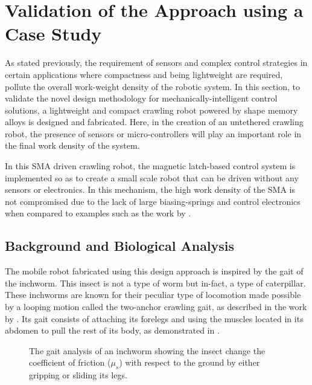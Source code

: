 \section{Validation of the Approach using a Case Study}
As stated previously, the requirement of sensors and complex control strategies in certain applications where compactness and being lightweight are required, pollute the overall work-weight density of the robotic system. In this section, to validate the novel design methodology for mechanically-intelligent control solutions, a lightweight and compact crawling robot powered by shape memory alloys is designed and fabricated. Here, in the creation of an untethered crawling robot, the presence of sensors or micro-controllers will play an important role in the final work density of the system.

In this SMA driven crawling robot, the magnetic latch-based control system is implemented so as to create a small scale robot that can be driven without any sensors or electronics. In this mechanism, the high work density of the SMA is not compromised due to the lack of large biasing-springs and control electronics when compared to examples such as the work by \todocite.

\subsection{Background and Biological Analysis}\label{subsec:bio-analysis}
The mobile robot fabricated using this design approach is inspired by the gait of the inchworm. This insect is not a type of worm but in-fact, a type of caterpillar. These inchworms are known for their peculiar type of locomotion made possible by a looping motion called the two-anchor crawling gait, as described in the work by \todocite. Its gait consists of attaching its forelegs and using the muscles located in its abdomen to pull the rest of its body, as demonstrated in \todocite.

\begin{figure}[ht!] %
  \centering
  \def\svgwidth{\textwidth}
  \resizebox{\textwidth}{!}{}
  \caption{The gait analysis of an inchworm showing the insect change the coefficient of friction ($\mu_s$) with respect to the ground by either gripping or sliding its legs.}
  \label{fig:real-inchworm-diagram}
\end{figure}

